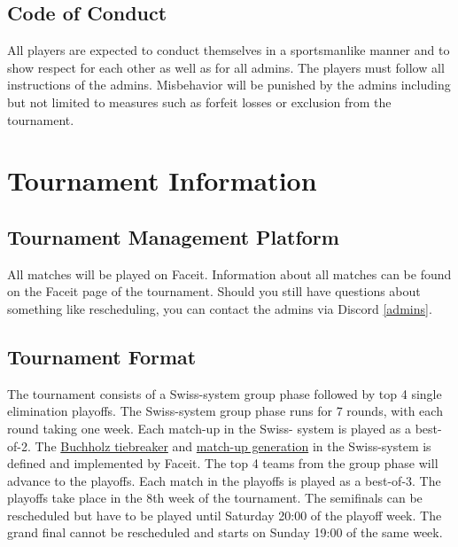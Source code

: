 \documentclass{article}
\begin{document}
\subsection{Code of Conduct}\label{conduct}
All players are expected to conduct themselves in a sportsmanlike manner and to show respect for each other
as well as for all admins. The players must follow all instructions of the admins. Misbehavior will be punished by the admins 
including but not limited to measures such as forfeit losses or exclusion from the tournament.

\section{Tournament Information}\label{tournament}
\subsection{Tournament Management Platform}\label{platform}
All matches will be played on Faceit. Information about all matches can be found on the Faceit page of the tournament. Should 
you still have questions about something like rescheduling, you can contact the admins via Discord \ref{admins}. 

\subsection{Tournament Format}\label{format}
The tournament consists of a Swiss-system group phase followed by top 4 single elimination playoffs. The 
Swiss-system group phase runs for 7 rounds, with each round taking one week. Each match-up in the Swiss-
system is played as a best-of-2. The \href{https://support.faceit.com/hc/en-us/articles/360003297299-What-are-tiebreakers-}{Buchholz tiebreaker} and \href{https://web.archive.org/web/20210410142913/https://support.faceit.com/hc/en-us/articles/360010288440-Swiss-system-tournaments}{match-up generation} in the Swiss-system is defined and implemented by Faceit.
The top 4 teams from the group phase will advance to the playoffs. Each match in the playoffs is played as a best-of-3. The playoffs take place in the 8th week of the tournament. The semifinals can be rescheduled but have to be played until Saturday 20:00 of the playoff week. The grand final cannot be rescheduled and starts on Sunday 19:00 of the same week.
\end{document}
